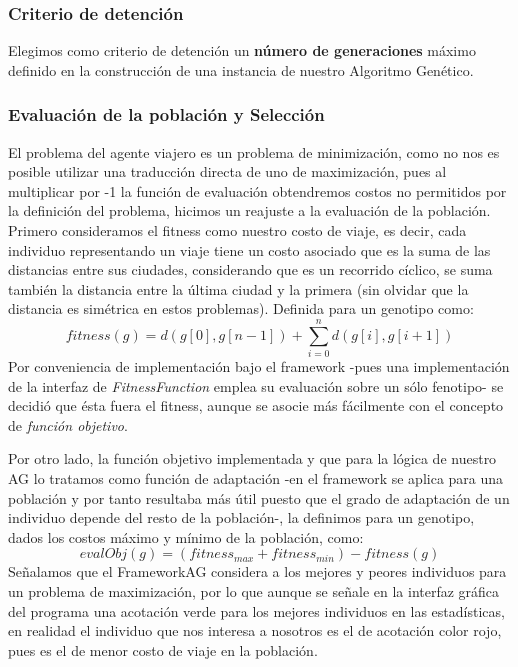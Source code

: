 \documentclass[12pt]{article}
\begin{document}
\subsubsection*{Criterio de detención}
Elegimos como criterio de detención un \textbf{número de generaciones} máximo
definido en la construcción de una instancia de nuestro Algoritmo Genético.
\subsubsection*{Evaluación de la población y Selección}
El problema del agente viajero es un problema de minimización,
como no nos es posible utilizar una traducción directa de uno de maximización,
pues al multiplicar por -1 la función de evaluación obtendremos
costos no permitidos por la definición del problema, hicimos un reajuste a
la evaluación de la población.
Primero consideramos el fitness como nuestro costo de viaje, es decir, cada
individuo representando un viaje tiene un costo asociado que es la suma de
las distancias entre sus ciudades, considerando que es un recorrido cíclico,
se suma también la distancia entre la última ciudad y la primera (sin olvidar
que la distancia es simétrica en estos problemas). Definida para un genotipo como:
\begin{equation}
  fitness(g) = d(g[0],g[n-1]) + \sum\limits_{i=0}^{n} d(g[i],g[i+1])
\end{equation}
Por conveniencia de implementación bajo el framework -pues una implementación de
la interfaz de \textit{FitnessFunction} emplea su evaluación sobre un sólo
fenotipo- se decidió que ésta fuera
el fitness, aunque se asocie más fácilmente con el concepto de \textit{función objetivo}.\par
Por otro lado, la función objetivo implementada y que para la lógica de
nuestro AG lo tratamos como función de adaptación -en el framework se aplica para una población
y por tanto resultaba más útil puesto que el grado de adaptación de un individuo
depende del resto de la población-, la definimos para un genotipo, dados los costos máximo
y mínimo de la población, como:
\begin{equation}
  evalObj(g) = (fitness_{max} + fitness_{min})-fitness(g)
\end{equation}
Señalamos que el FrameworkAG considera a los mejores y peores individuos para
un problema de maximización, por lo que aunque se señale en la interfaz gráfica
del programa una acotación verde para los mejores individuos en las estadísticas,
en realidad el individuo que nos interesa a nosotros es el de acotación color
rojo, pues es el de menor costo de viaje en la población.\par
\end{document}
